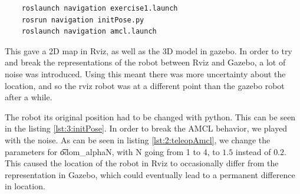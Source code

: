 \begin{lstlisting}
	roslaunch navigation exercise1.launch
	rosrun navigation initPose.py
	roslaunch navigation amcl.launch
\end{lstlisting}

This gave a 2D map in Rviz, as well as the 3D model in gazebo. In order to try and break the representations of the robot between Rviz and Gazebo, a lot of noise was introduced. Using this meant there was more uncertainty about the location, and so the rviz robot was at a different point than the gazebo robot after a while.





The robot its original position had to be changed with python. This can be seen in the listing \ref{lst:3:initPose}. In order to break the AMCL behavior, we played with the noise. As can be seen in listing \ref{lst:2:teleopAmcl}, we change the parameters for \t{odom_alphaN}, with N going from 1 to 4, to $1.5$ instead of $0.2$. This caused the location of the robot in Rviz to occasionally differ from the representation in Gazebo, which could eventually lead to a permanent difference in location.